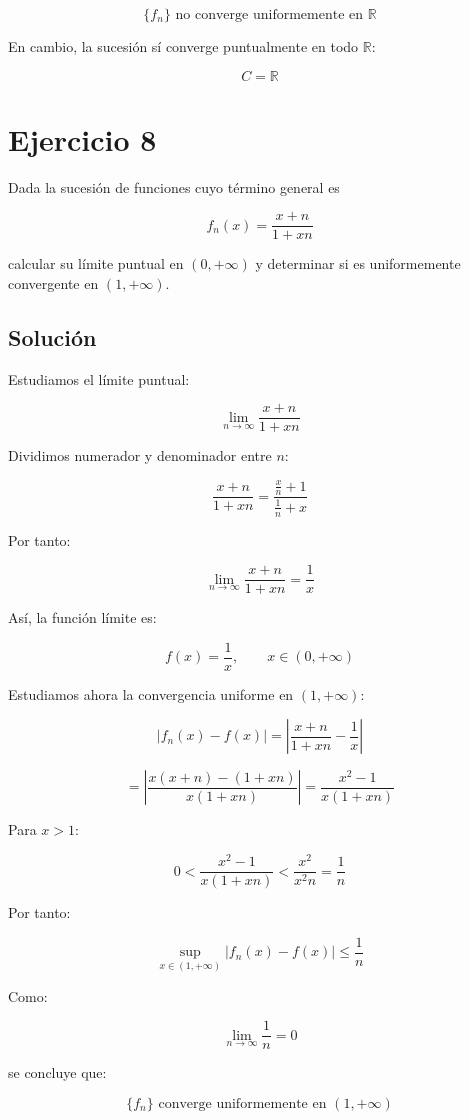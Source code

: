 \documentclass[fleqn]{article}
\begin{document}
	\[
	\boxed{
	\{f_n\}\text{ no converge uniformemente en }\mathbb{R}
	}
	\]

	En cambio, la sucesión sí converge puntualmente en todo $\mathbb{R}$:

	\[
	\boxed{
	C=\mathbb{R}
	}
	\]

\section{Ejercicio 8}
	Dada la sucesión de funciones cuyo término general es

	\[
	f_n(x)=\frac{x+n}{1+xn}
	\]

	calcular su límite puntual en $(0,+\infty)$ y determinar si es uniformemente convergente en $(1,+\infty)$.

	\subsection{Solución}

	Estudiamos el límite puntual:

	\[
	\lim_{n\to\infty}
	\frac{x+n}{1+xn}
	\]

	Dividimos numerador y denominador entre $n$:

	\[
	\frac{x+n}{1+xn}
	=
	\frac{\frac{x}{n}+1}{\frac{1}{n}+x}
	\]

	Por tanto:

	\[
	\lim_{n\to\infty}
	\frac{x+n}{1+xn}
	=
	\frac{1}{x}
	\]

	Así, la función límite es:

	\[
	\boxed{
	f(x)=\frac{1}{x},
	\qquad x\in(0,+\infty)
	}
	\]

	Estudiamos ahora la convergencia uniforme en $(1,+\infty)$:

	\[
	\left|
	f_n(x)-f(x)
	\right|
	=
	\left|
	\frac{x+n}{1+xn}
	-
	\frac{1}{x}
	\right|
	\]

	\[
	=
	\left|
	\frac{x(x+n)-(1+xn)}
	{x(1+xn)}
	\right|
	=
	\frac{x^2-1}{x(1+xn)}
	\]

	Para $x>1$:

	\[
	0<
	\frac{x^2-1}{x(1+xn)}
	<
	\frac{x^2}{x^2n}
	=
	\frac{1}{n}
	\]

	Por tanto:

	\[
	\sup_{x\in(1,+\infty)}
	|f_n(x)-f(x)|
	\leq
	\frac{1}{n}
	\]

	Como:

	\[
	\lim_{n\to\infty}\frac{1}{n}=0
	\]

	se concluye que:

	\[
	\boxed{
	\{f_n\}\text{ converge uniformemente en }(1,+\infty)
	}
	\]
\end{document}
